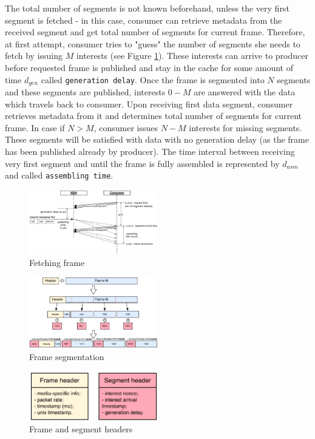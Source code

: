 \documentclass[10pt]{proc}
\begin{document}
The total number of segments is not known beforehand, unless the very first segment is fetched - in this case, consumer can retrieve metadata from the received segment and get total number of segments for current frame. 
Therefore, at first attempt, consumer tries to "guess" the number of segments she needs to fetch by issuing $M$ interests (see Figure \ref{fig:pull}). These interests can arrive to producer before requested frame is published and stay in the cache for some amount of time $d_{gen}$ called \texttt{generation delay}. Once the frame is segmented into $N$ segments and these segments are published, interests $0 - M$ are answered with the data which travels back to consumer. Upon receiving first data segment, consumer retrieves metadata from it and determines total number of segments for current frame. In case if $N > M$, consumer issues $N - M$ interests for missing segments. These segments will be satisfied with data with no generation delay (as the frame has been published already by producer). The time interval between receiving very first segment and until the frame is fully assembled is represented by $d_{asm}$ and called \texttt{assembling time}.

\begin{figure}[Ht!]
\centering
\includegraphics[width=0.5\textwidth]{frame-fetch}
\caption{Fetching frame}
\label{fig:pull}
\end{figure}

\begin{figure}[Ht!]
\centering
\includegraphics[width=0.5\textwidth]{segmentation}
\caption{Frame segmentation}
\label{fig:segment}
\end{figure}

\begin{figure}[Ht!]
\centering
\includegraphics[width=0.5\textwidth]{data-struct}
\caption{Frame and segment headers}
\label{fig:data-struct}
\end{figure}
\end{document}
